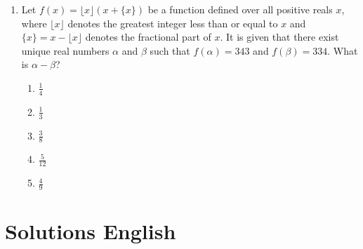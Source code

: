 \documentclass{article}
\begin{document}
\begin{enumerate}
\item Let $f(x)=\lfloor x\rfloor(x+\{x\})$ be a function defined over all positive reals $x$, where $\lfloor x\rfloor$ denotes the greatest integer less than or equal to $x$ and $\{x\}=x-\lfloor x\rfloor$ denotes the fractional part of $x$. It is given that there exist unique real numbers $\alpha$ and $\beta$ such that $f(\alpha)=343$ and $f(\beta)=334$. What is $\alpha-\beta$?
\begin{enumerate}
    \item $\frac{1}{4}$
    \item $\frac{1}{3}$
    \item $\frac{3}{8}$
    \item $\frac{5}{12}$
    \item $\frac{4}{9}$
\end{enumerate}

\end{enumerate}

\section*{Solutions English}
\end{document}
